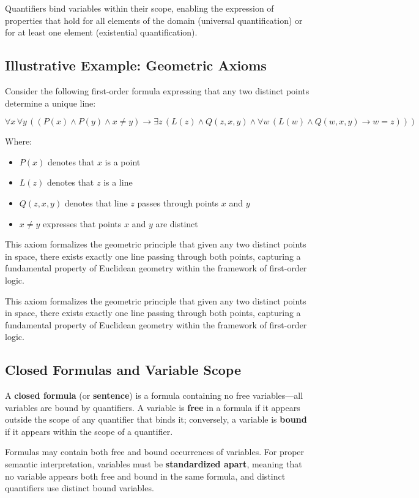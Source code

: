 \documentclass[11pt,a4paper]{article}
\theoremstyle{definition}
\theoremstyle{plain}
\theoremstyle{remark}
\begin{document}
Quantifiers bind variables within their scope, enabling the expression of properties that hold for all elements of the domain (universal quantification) or for at least one element (existential quantification).

\subsection{Illustrative Example: Geometric Axioms}

Consider the following first-order formula expressing that any two distinct points determine a unique line:

\[
\forall x \, \forall y \, \left( (P(x) \wedge P(y) \wedge x \neq y) \rightarrow \exists z \, (L(z) \wedge Q(z, x, y) \wedge \forall w \, (L(w) \wedge Q(w, x, y) \rightarrow w = z)) \right)
\]

Where:
\begin{itemize}
    \item $P(x)$ denotes that $x$ is a point
    \item $L(z)$ denotes that $z$ is a line
    \item $Q(z, x, y)$ denotes that line $z$ passes through points $x$ and $y$
    \item $x \neq y$ expresses that points $x$ and $y$ are distinct
\end{itemize}

This axiom formalizes the geometric principle that given any two distinct points in space, there exists exactly one line passing through both points, capturing a fundamental property of Euclidean geometry within the framework of first-order logic. 

This axiom formalizes the geometric principle that given any two distinct points in space, there exists exactly one line passing through both points, capturing a fundamental property of Euclidean geometry within the framework of first-order logic.

\subsection{Closed Formulas and Variable Scope}

A \textbf{closed formula} (or \textbf{sentence}) is a formula containing no free variables---all variables are bound by quantifiers. A variable is \textbf{free} in a formula if it appears outside the scope of any quantifier that binds it; conversely, a variable is \textbf{bound} if it appears within the scope of a quantifier.

Formulas may contain both free and bound occurrences of variables. For proper semantic interpretation, variables must be \textbf{standardized apart}, meaning that no variable appears both free and bound in the same formula, and distinct quantifiers use distinct bound variables.
\end{document}

